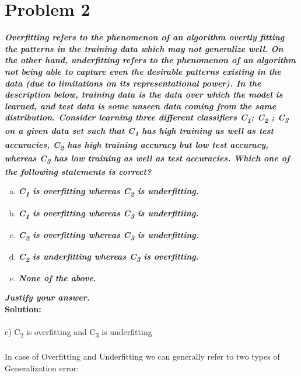 \documentclass[12pt,letterpaper]{article}
\begin{document}
\section*{Problem 2}
\textbf{\emph{Overfitting refers to the phenomenon of an algorithm overtly fitting the patterns in the training data which may not generalize well. On the other hand, underfitting refers to the phenomenon of an algorithm not being able to capture even the desirable patterns existing in the data (due to limitations on its representational power). In the description below, training data is the data over which the model is learned, and test data is some unseen data coming from the same distribution. Consider learning three different classifiers C\textsubscript{1}; C\textsubscript{2} ; C\textsubscript{3} on a given data set such that C\textsubscript{1} has high training as well as test
accuracies, C\textsubscript{2} has high training accuracy but low test accuracy, whereas C\textsubscript{3} has low training as well as test accuracies. Which one of the following statements is correct?
}}
\begin{enumerate}[a.]
\item \textbf{\emph{ C\textsubscript{1} is overfitting whereas C\textsubscript{2} is underfitting. }}

\item \textbf{\emph{ C\textsubscript{1} is overfitting whereas C\textsubscript{3} is underfitiing. }}

\item \textbf{\emph{ C\textsubscript{2} is overfitting whereas C\textsubscript{3} is underfitting. }}

\item \textbf{\emph{ C\textsubscript{2} is underfitting whereas C\textsubscript{3} is overfitting. }}
\item \textbf{\emph{ None of the above. }}
\end{enumerate}
\textbf{\emph{Justify your answer.}}\\
\textbf {Solution:} \\ \\
c) C\textsubscript{2} is overfitting and C\textsubscript{3} is underfitting
\\ \\
In case of Overfitting and Underfitting we can generally refer to two types of Generalization error:
\end{document}
